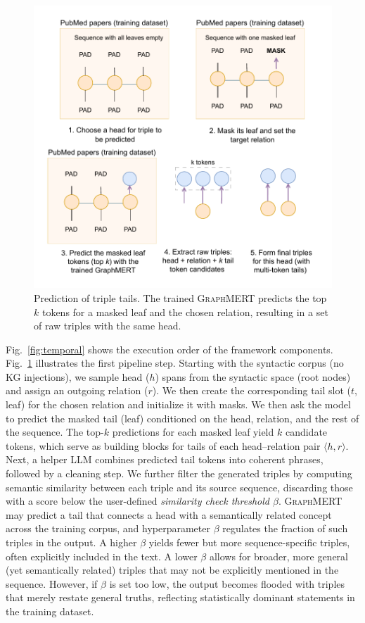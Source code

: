 \documentclass[10pt]{article}
\newcommand{\ours}{\textsc{GraphMERT}\xspace}
\begin{document}
\begin{figure}[t!]
\centering
\includegraphics[width=0.7\linewidth]{pictures/prediction.pdf}
\caption{Prediction of triple tails. The trained \ours predicts the top $k$ tokens for a masked leaf and the chosen relation, resulting in a set of raw triples with the same head.}
\label{fig:prediction}
\end{figure}  

Fig.~\ref{fig:temporal} shows the execution order of the framework components. Fig.~\ref{fig:prediction} illustrates the first pipeline step. Starting with the syntactic corpus (no KG injections), we sample head ($h$) spans from the syntactic space (root nodes) and assign an outgoing relation ($r$). We then create the corresponding tail slot ($t$, leaf) for the chosen relation and initialize it with masks. We then ask the model to predict the masked tail (leaf) conditioned on the head, relation, and the rest of the sequence. The top-$k$ predictions for each masked leaf yield $k$ candidate tokens, which serve as building blocks for tails of each head–relation pair $\langle h, r \rangle$. Next, a helper LLM combines predicted tail tokens into coherent phrases, followed by a cleaning step. We further filter the generated triples by computing semantic similarity between each triple and its source sequence, discarding those with a score below the user-defined \emph{similarity check threshold $\beta$}. \ours may predict a tail that connects a head with a semantically related concept across the training corpus, and hyperparameter $\beta$ regulates the fraction of such triples in the output. A higher $\beta$ yields fewer but more sequence-specific triples, often explicitly included in the text. A lower $\beta$ allows for broader, more general (yet semantically related) triples that may not be explicitly mentioned in the sequence. However, if $\beta$ is set too low, the output becomes flooded with triples that merely restate general truths, reflecting statistically dominant statements in the training dataset.  
\end{document}
